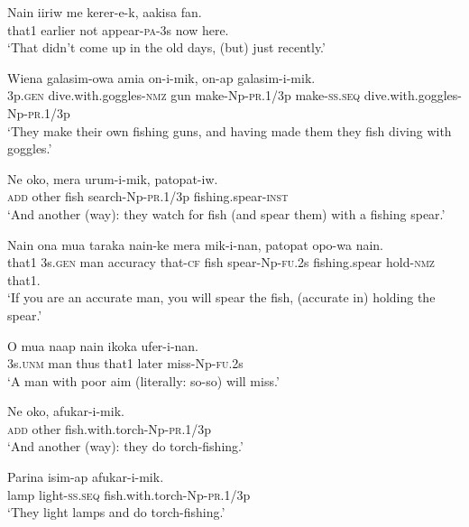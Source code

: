 \ea
\gll  Nain  iiriw  me  kerer-e-k,  aakisa  fan. \\
that1  earlier  not  appear-\textsc{pa}-3s  now  here. \\
\glt ‘That didn’t come up in the old days, (but) just recently.’ \\
\z


\ea
\gll  Wiena  galasim-owa  amia  on-i-mik,           on-ap  galasim-i-mik. \\
3p.\textsc{gen}  dive.with.goggles-\textsc{nmz}  gun  make-Np-\textsc{pr}.1/3p make-\textsc{ss.seq}  dive.with.goggles-Np-\textsc{pr}.1/3p \\


\glt ‘They make their own fishing guns, and having made them they fish diving with goggles.’ \\
\z


\ea
\gll  Ne  oko,  mera  urum-i-mik,  patopat-iw. \\
\textsc{add}  other  fish  search-Np-\textsc{pr}.1/3p  fishing.spear-\textsc{inst} \\
\glt ‘And another (way): they watch for fish (and spear them) with a fishing spear.’ \\
\z


\ea
\gll  Nain  ona  mua  taraka  nain-ke  mera  mik-i-nan,       patopat  opo-wa  nain. \\
that1  3s.\textsc{gen}  man  accuracy  that-\textsc{cf}  fish  spear-Np-\textsc{fu}.2s   fishing.spear  hold-\textsc{nmz}  that1. \\


\glt ‘If you are an accurate man, you will spear the fish, (accurate in) holding the spear.’ \\
\z


\ea
\gll  O  mua  naap  nain  ikoka  ufer-i-nan. \\
3s.\textsc{unm}  man  thus  that1  later  miss-Np-\textsc{fu}.2s \\
\glt ‘A man with poor aim (literally: so-so) will miss.’ \\
\z


\ea
\gll  Ne  oko,  afukar-i-mik. \\
\textsc{add}  other  fish.with.torch-Np-\textsc{pr}.1/3p \\
\glt ‘And another (way): they do torch-fishing.’ \\
\z


\ea
\gll  Parina  isim-ap  afukar-i-mik. \\
lamp  light-\textsc{ss.seq}  fish.with.torch-Np-\textsc{pr}.1/3p \\
\glt ‘They light lamps and do torch-fishing.’ \\
\z


